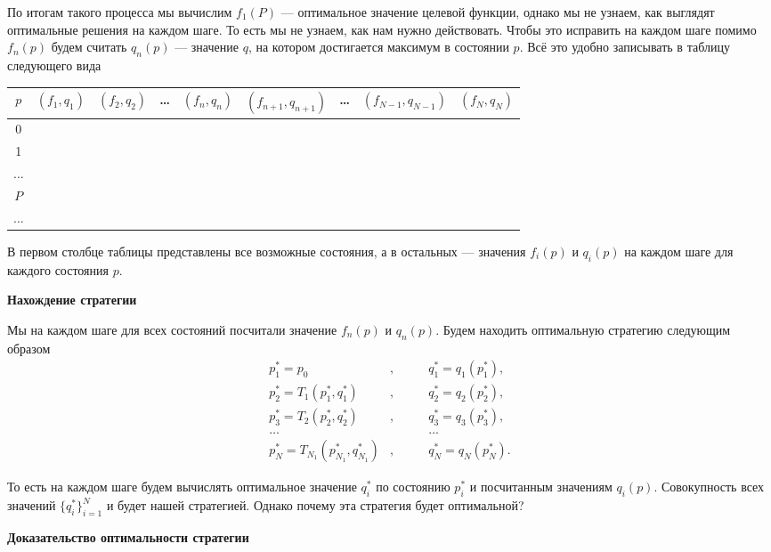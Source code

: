 По итогам такого процесса мы вычислим $f_1(P)$ --- оптимальное значение целевой функции, однако мы не узнаем, как выглядят оптимальные решения на каждом шаге. То есть мы не узнаем, как нам нужно действовать. Чтобы это исправить на каждом шаге помимо $f_n(p)$ будем считать $q_n(p)$ --- значение $q$, на котором достигается максимум в состоянии $p$. Всё это удобно записывать в таблицу следующего вида
\begin{table}[H]
	\centering
	\begin{tabular}{ | c | c | c | c | c | c | c | c | c | } 
		\hline
		$p$ & $(f_1, q_1)$ & $(f_2, q_2)$ & \dots & $(f_n, q_n)$ & $(f_{n+1}, q_{n+1})$ & \dots & $(f_{N-1}, q_{N-1})$ & $(f_N, q_N)$ \\ 
		\hline
		0 & & & & & & & & \\\hline
		1 & & & & & & & & \\\hline
		$\dots$ & & & & & & & & \\\hline
		$P$ & & & & & & & & \\\hline
		$\dots$ & & & & & & & & \\\hline
	\end{tabular}
\end{table}

В первом столбце таблицы представлены все возможные состояния, а в остальных --- значения $f_i(p)$ и $q_i(p)$ на каждом шаге для каждого состояния $p$.

\bigskip

\textbf{Нахождение стратегии}

Мы на каждом шаге для всех состояний посчитали значение $f_n(p)$ и $q_n(p)$. Будем находить оптимальную стратегию следующим образом
\begin{align*}
	p_1^* = p_0&, \qquad &q_1^* = q_1(p_1^*), \\
	p_2^* = T_1(p_1^*, q_1^*)&, &q_2^* = q_2(p_2^*), \\
	p_3^* = T_2(p_2^*, q_2^*)&, &q_3^* = q_3(p_3^*), \\
	\dots& &\dots \\
	p_N^* = T_{N_1}(p_{N_1}^*, q_{N_1}^*)&, &q_N^* = q_N(p_N^*).
\end{align*}

То есть на каждом шаге будем вычислять оптимальное значение $q_i^*$ по состоянию $p_i^*$ и посчитанным значениям $q_i(p)$. Совокупность всех значений $\{q_i^*\}_{i=1}^{N}$ и будет нашей стратегией. Однако почему эта стратегия будет оптимальной?

\bigskip

\textbf{Доказательство оптимальности стратегии}

